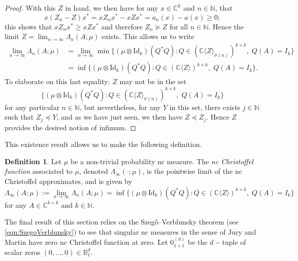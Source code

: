 \documentclass[11pt,reqno]{amsart}
\def\s{\sigma}
\def\L{\Lambda}
\def\NN{\mathbb{N}}
\def\CC{\mathbb{C}}
\def\BB{\mathbb{B}}
\theoremstyle{definition}
\newtheorem{definition}[theorem]{Definition}
\numberwithin{equation}{section}
\begin{document}
\begin{proof}
    With this \(Z\) in hand, we then have for any \(x \in \CC^k\) and \(n \in \NN\), that
    \[
        x(Z_n - Z)x^* = xZ_nx^* - xZx^* = a_n(x) - a(x) \geq 0;
    \]
    this shows that \(xZ_nx^* \geq xZx^*\) and therefore \(Z_n \succeq Z\) for all \(n \in \NN\). Hence the limit \(Z = \lim_{n\to\infty} \L_{n}(A; \mu)\) exists. This allows us to write
    \begin{align*}
        \lim_{n\to\infty} \L_{n}(A; \mu) & = \lim_{n\to\infty} \min\{(\mu \otimes \mathrm{Id}_k)(Q^*Q) : Q \in (\CC\langle Z \rangle_{\s(n)})^{k\times k}, \; Q(A) = I_k\} \\
        & = \inf\{(\mu \otimes \mathrm{Id}_k)(Q^*Q) : Q \in (\CC\langle Z \rangle)^{k\times k}, \; Q(A) = I_k\}.
    \end{align*}
    To elaborate on this last equality: \(Z\) may not be in the set
    \[
        \{(\mu \otimes \mathrm{Id}_k)(Q^*Q) : Q \in (\CC\langle Z \rangle_{\s(n)})^{k\times k}, \; Q(A) = I_k\}
    \]
    for any particular \(n \in \NN\), but nevertheless, for any \(Y\) in this set, there exists \(j \in \NN\) such that \(Z_j \preceq Y\), and as we have just seen, we then have \(Z \preceq Z_j\). Hence \(Z\) provides the desired notion of infimum.
\end{proof}

This existence result allows us to make the following definition.

\begin{definition}
    \label{def:ncChristoffelFunction}
    Let \(\mu\) be a non-trivial probability nc measure. The \emph{nc Christoffel function} associated to \(\mu\), denoted \(\L_{\infty}(\cdot; \mu)\), is the pointwise limit of the nc Christoffel approximates, and is given by
    \[
        \L_{\infty}(A; \mu) := \lim_{n\to\infty} \L_{n}(A; \mu) = \inf\{(\mu \otimes \mathrm{Id}_k)(Q^*Q) : Q \in (\CC\langle Z \rangle)^{k\times k}, \; Q(A) = I_k\}
    \]
    for any \(A \in \CC^{k\times k}\) and \(k\in \NN\).
\end{definition}

The final result of this section relies on the Szeg\H{o}--Verblunsky theorem (see \eqref{eqn:SzegoVerblunsky}) to see that singular nc measures in the sense of Jury and Martin \cite{JM22b} have zero nc Christoffel function at zero. Let \(0^{(d)}_{1\times1}\) be the \(d-\)tuple of scalar zeros \((0, \ldots, 0) \in \BB^d_1\).
\end{document}

